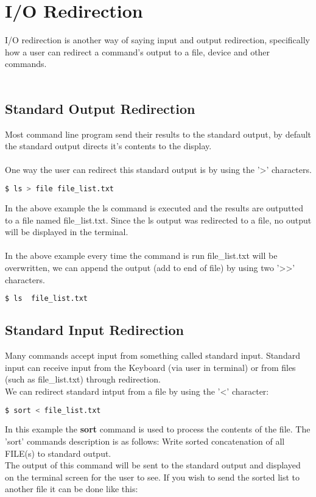 \documentclass[12pt, letterpaper]{report}
\begin{document}
\section{I/O Redirection}
I/O redirection is another way of saying input and output redirection, specifically
how a user can redirect a command's output to a file, device and other commands.\\\\

\subsection{Standard Output Redirection}
Most command line program send their results to the standard output, by default 
the standard output directs it's contents to the display.\\\\

One way the user can redirect this standard output is by using the '>' characters.
\begin{lstlisting}[language=Bash,framexleftmargin=5mm,frame=single,xleftmargin=18pt]
$ ls > file file_list.txt
\end{lstlisting}
In the above example the ls command is executed and the results are outputted 
to a file named file\_list.txt. Since the ls output was redirected to a file, no 
output will be displayed in the terminal.\\\\

In the above example every time the command is run file\_list.txt will be overwritten, 
we can append the output (add to end of file) by using two '>>' characters.
\begin{lstlisting}[language=Bash,framexleftmargin=5mm,frame=single,xleftmargin=18pt]
$ ls  file_list.txt
\end{lstlisting}

\subsection{Standard Input Redirection}
Many commands accept input from something called standard input. Standard input 
can receive input from the Keyboard (via user in terminal) or from files (such as 
file\_list.txt) through redirection.\\
We can redirect standard intput from a file by using the '<' character:
\begin{lstlisting}[language=Bash,framexleftmargin=5mm,frame=single,xleftmargin=18pt]
$ sort < file_list.txt
\end{lstlisting}
In this example the \textbf{sort} command is used to process the contents of 
the file. The 'sort' commands description is as follows: Write sorted concatenation of all FILE(s) to standard output.\\
The output of this command will be sent to the standard output and displayed on
the terminal screen for the user to see. If you wish to send the sorted list to
another file it can be done like this:
\end{document}
